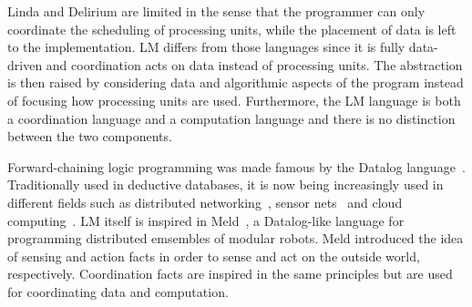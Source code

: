 Linda and Delirium are limited in the sense that the programmer can only
coordinate the scheduling of processing units, while the placement of data is
left to the implementation. LM differs from those languages since it
is fully data-driven and coordination acts on data instead of processing units.
The abstraction is then raised by considering data and algorithmic aspects of
the program instead of focusing how processing units are used.
Furthermore, the LM language is both a coordination language and a computation
language and there is no distinction between the two components.

Forward-chaining logic programming was made famous by the Datalog
language~\cite{Ullman:1990:PDK:533142}.  Traditionally used in deductive
databases, it is now being increasingly used in different fields such as
distributed networking~\cite{Loo-condie-garofalakis-p2}, sensor
nets~\cite{Chu:2007:DID:1322263.1322281} and cloud computing~\cite{alvaro:boom}.
LM itself is inspired in Meld~\cite{ashley-rollman-iclp09}, a Datalog-like language for
programming distributed emsembles of modular robots. Meld introduced the idea of
sensing and action facts in order to sense and act on the outside world,
respectively. Coordination facts are inspired in the same principles but are
used for coordinating data and computation.
